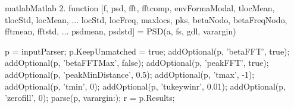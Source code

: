 \begin{sourcecode}{matlab}{Matlab 2.}
	function [f, psd, fft, fftcomp, envFormaModal, tlocMean, tlocStd, locMean, ...
    locStd, locFreq, maxlocs, pks, betaNodo, betaFreqNodo, fftmean, fftstd, ...
    psdmean, psdstd] = PSD(a, fs, gdl, varargin)
%
%
%

p = inputParser;
p.KeepUnmatched = true;
addOptional(p, 'betaFFT', true);
addOptional(p, 'betaFFTMax', false); %
addOptional(p, 'peakFFT', true);
addOptional(p, 'peakMinDistance', 0.5); %
addOptional(p, 'tmax', -1);
addOptional(p, 'tmin', 0);
addOptional(p, 'tukeywinr', 0.01);
addOptional(p, 'zerofill', 0);
parse(p, varargin{:});
r = p.Results;


\end{sourcecode}
